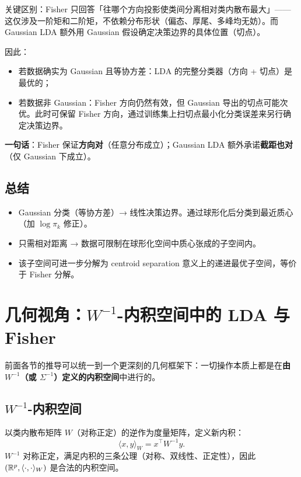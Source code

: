 关键区别：Fisher 只回答「往哪个方向投影使类间分离相对类内散布最大」——这仅涉及一阶矩和二阶矩，不依赖分布形状（偏态、厚尾、多峰均无妨）。而 Gaussian LDA 额外用 Gaussian 假设确定决策边界的具体位置（切点）。

因此：
\begin{itemize}
    \item 若数据确实为 Gaussian 且等协方差：LDA 的完整分类器（方向 + 切点）是最优的；
    \item 若数据非 Gaussian：Fisher 方向仍然有效，但 Gaussian 导出的切点可能次优。此时可保留 Fisher 方向，通过训练集上扫切点最小化分类误差来另行确定决策边界。
\end{itemize}

\textbf{一句话}：Fisher 保证\textbf{方向对}（任意分布成立）；Gaussian LDA 额外承诺\textbf{截距也对}（仅 Gaussian 下成立）。

\subsection{总结}

\begin{itemize}
    \item Gaussian 分类（等协方差）→ 线性决策边界。通过球形化后分类到最近质心（加 $\log\pi_k$ 修正）。
    \item 只需相对距离 → 数据可限制在球形化空间中质心张成的子空间内。
    \item 该子空间可进一步分解为 centroid separation 意义上的递进最优子空间，等价于 Fisher 分解。
\end{itemize}


\section{几何视角：$W^{-1}$-内积空间中的 LDA 与 Fisher}

前面各节的推导可以统一到一个更深刻的几何框架下：一切操作本质上都是在\textbf{由 $W^{-1}$（或 $\Sigma^{-1}$）定义的内积空间}中进行的。

\subsection{$W^{-1}$-内积空间}

以类内散布矩阵 $W$（对称正定）的逆作为度量矩阵，定义新内积：
\begin{equation}\label{eq:W_inner}
    \langle x, y \rangle_W = x^\top W^{-1} y.
\end{equation}
$W^{-1}$ 对称正定，满足内积的三条公理（对称、双线性、正定性），因此 $(\mathbb{R}^p, \langle\cdot,\cdot\rangle_W)$ 是合法的内积空间。

